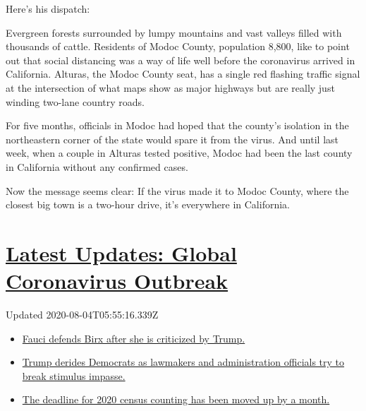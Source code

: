 Here's his dispatch:

Evergreen forests surrounded by lumpy mountains and vast valleys filled
with thousands of cattle. Residents of Modoc County, population 8,800,
like to point out that social distancing was a way of life well before
the coronavirus arrived in California. Alturas, the Modoc County seat,
has a single red flashing traffic signal at the intersection of what
maps show as major highways but are really just winding two-lane country
roads.

For five months, officials in Modoc had hoped that the county's
isolation in the northeastern corner of the state would spare it from
the virus. And until last week, when a couple in Alturas tested
positive, Modoc had been the last county in California without any
confirmed cases.

Now the message seems clear: If the virus made it to Modoc County, where
the closest big town is a two-hour drive, it's everywhere in California.

\hypertarget{latest-updates-global-coronavirus-outbreak}{%
\section{\texorpdfstring{\href{https://www.nytimes.com/2020/08/03/world/coronavirus-covid-19.html?action=click\&pgtype=Article\&state=default\&region=MAIN_CONTENT_1\&context=storylines_live_updates}{Latest
Updates: Global Coronavirus
Outbreak}}{Latest Updates: Global Coronavirus Outbreak}}\label{latest-updates-global-coronavirus-outbreak}}

Updated 2020-08-04T05:55:16.339Z

\begin{itemize}
\tightlist
\item
  \href{https://www.nytimes.com/2020/08/03/world/coronavirus-covid-19.html?action=click\&pgtype=Article\&state=default\&region=MAIN_CONTENT_1\&context=storylines_live_updates\#link-4547638f}{Fauci
  defends Birx after she is criticized by Trump.}
\item
  \href{https://www.nytimes.com/2020/08/03/world/coronavirus-covid-19.html?action=click\&pgtype=Article\&state=default\&region=MAIN_CONTENT_1\&context=storylines_live_updates\#link-15e7f995}{Trump
  derides Democrats as lawmakers and administration officials try to
  break stimulus impasse.}
\item
  \href{https://www.nytimes.com/2020/08/03/world/coronavirus-covid-19.html?action=click\&pgtype=Article\&state=default\&region=MAIN_CONTENT_1\&context=storylines_live_updates\#link-e5a2cda}{The
  deadline for 2020 census counting has been moved up by a month.}
\end{itemize}


